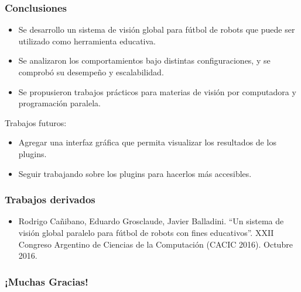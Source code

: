 \documentclass[11pt,a4paper,spanish]{beamer}
\begin{document}
\begin{frame}

\frametitle{Conclusiones}

\begin{itemize}

	\item Se desarrollo un sistema de visión global para fútbol de robots
		que puede ser utilizado como herramienta educativa.

	\item Se analizaron los comportamientos bajo distintas configuraciones,
		y se comprobó su desempeño y escalabilidad.

	\item Se propusieron trabajos prácticos para materias de visión por
		computadora y programación paralela.

\end{itemize}

Trabajos futuros:

\begin{itemize}

	\item Agregar una interfaz gráfica que permita visualizar los resultados
		de los plugins.

	\item Seguir trabajando sobre los plugins para hacerlos más accesibles.

\end{itemize}

\end{frame}

\begin{frame}

	\frametitle{Trabajos derivados}

\begin{itemize}

	\item{Rodrigo Cañibano, Eduardo Grosclaude, Javier Balladini. ``Un
		sistema de visión global paralelo para fútbol de robots con
		fines educativos''. XXII Congreso Argentino de Ciencias de la
		Computación (CACIC 2016). Octubre 2016.}

\end{itemize}

\end{frame}


\begin{frame}

	\frametitle{¡Muchas Gracias!}

\end{frame}
\end{document}
